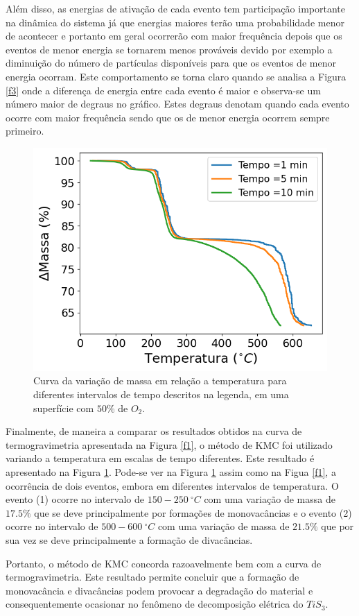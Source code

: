 \documentclass[11pt]{article}
\begin{document}
Além disso, as energias de ativação de cada evento tem participação importante na dinâmica do sistema já que energias maiores terão uma probabilidade menor de acontecer e portanto em geral ocorrerão com maior frequência depois que os eventos de menor energia se tornarem menos prováveis devido por exemplo a diminuição do número de partículas disponíveis para que os eventos de menor energia ocorram. Este comportamento se torna claro quando se analisa a Figura \ref{f3} onde a diferença de energia entre cada evento é maior e observa-se um número maior de degraus no gráfico. Estes degraus denotam quando cada evento ocorre com maior frequência sendo que os de menor energia ocorrem sempre primeiro.

\begin{figure}[!htbp]
\centering\includegraphics[scale=0.6]{figures/Temperatura-massa.png}
\caption{Curva da variação de massa em relação a temperatura para diferentes intervalos de tempo descritos na legenda, em uma superfície com $50\%$ de $O_2$.}
\label{f4}
\end{figure}


Finalmente, de maneira a comparar os resultados obtidos na curva de termogravimetria apresentada na Figura \ref{f1}, o método de KMC foi utilizado variando a temperatura em escalas de tempo diferentes. Este resultado é apresentado na Figura \ref{f4}. Pode-se ver na Figura \ref{f4} assim como na Figua \ref{f1}, a ocorrência de dois eventos, embora em diferentes intervalos de temperatura. O evento (1) ocorre no intervalo de \(150-250~^\circ C\) com uma variação de massa de \(17.5\%\) que se deve principalmente por formações de monovacâncias e o evento (2) ocorre no intervalo de  \(500-600~^\circ C\) com uma variação de massa de \(21.5\%\) que por sua vez se deve principalmente a formação de divacâncias.

Portanto, o método de KMC concorda razoavelmente bem com a curva de termogravimetria. Este resultado permite concluir que a formação de monovacância e divacâncias podem provocar a degradação do material e consequentemente ocasionar no fenômeno de decomposição elétrica do \(TiS_3\).




\end{document}
